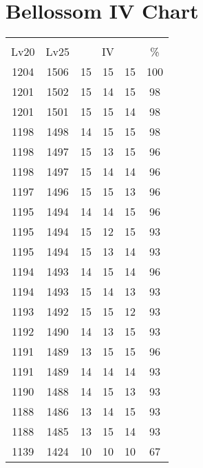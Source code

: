 \documentclass{article}%
\begin{document}
%
\normalsize%
\section{Bellossom IV Chart}%
\label{sec:Bellossom IV Chart}%
\renewcommand{\arraystretch}{1.5}%
\begin{tabular}{|c|c|c|c|c|c|}%
\hline%
\multicolumn{6}{|c|}{\textcolor{white}{ 
\linebreak{Bellossom}
}%
\cellcolor{black}}\\%
\multicolumn{1}{|c}{Lv20}&\multicolumn{1}{c|}{Lv25}&\multicolumn{3}{c|}{IV}&\multicolumn{1}{|c|}{\%}\\%
\hline%
\rowcolor{color100}%
1204&1506&15&15&15&100\\%
\hline%
\rowcolor{color98}%
1201&1502&15&14&15&98\\%
\hline%
\rowcolor{color98}%
1201&1501&15&15&14&98\\%
\hline%
\rowcolor{color98}%
1198&1498&14&15&15&98\\%
\hline%
\rowcolor{color96}%
1198&1497&15&13&15&96\\%
\hline%
\rowcolor{color96}%
1198&1497&15&14&14&96\\%
\hline%
\rowcolor{color96}%
1197&1496&15&15&13&96\\%
\hline%
\rowcolor{color96}%
1195&1494&14&14&15&96\\%
\hline%
\rowcolor{color93}%
1195&1494&15&12&15&93\\%
\hline%
\rowcolor{color93}%
1195&1494&15&13&14&93\\%
\hline%
\rowcolor{color96}%
1194&1493&14&15&14&96\\%
\hline%
\rowcolor{color93}%
1194&1493&15&14&13&93\\%
\hline%
\rowcolor{color93}%
1193&1492&15&15&12&93\\%
\hline%
\rowcolor{color93}%
1192&1490&14&13&15&93\\%
\hline%
\rowcolor{color96}%
1191&1489&13&15&15&96\\%
\hline%
\rowcolor{color93}%
1191&1489&14&14&14&93\\%
\hline%
\rowcolor{color93}%
1190&1488&14&15&13&93\\%
\hline%
\rowcolor{color93}%
1188&1486&13&14&15&93\\%
\hline%
\rowcolor{color93}%
1188&1485&13&15&14&93\\%
\hline%
\rowcolor{color91}%
1139&1424&10&10&10&67\\%
\end{tabular}

%
\end{document}
